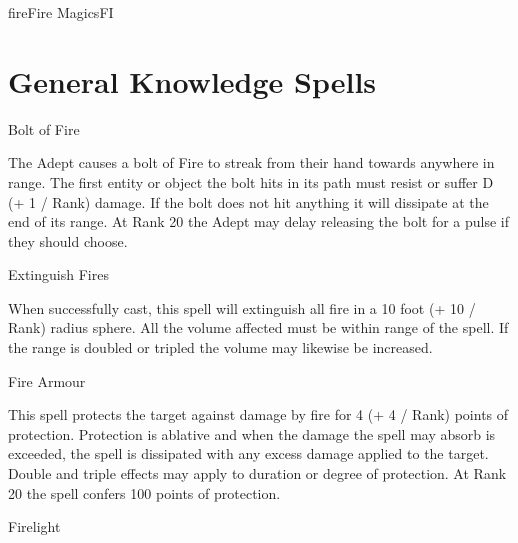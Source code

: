 \begin{College}[2.0]{fire}{Fire Magics}{FI}
\section{General Knowledge Spells}

\begin{spell}[G-1]{Bolt of Fire}

\begin{effects}
The Adept causes a bolt of Fire to streak from their hand towards
anywhere in range.  The first entity or object the bolt hits in its
path must resist or suffer D (+ 1 / Rank) damage.  If the bolt does
not hit anything it will dissipate at the end of its range. At Rank 20
the Adept may delay releasing the bolt for a pulse if they should
choose.

\end{effects}
\end{spell}

\begin{spell}[G-2]{Extinguish Fires}

\begin{effects}
When successfully cast, this spell will extinguish all fire in a 10
foot (+ 10 / Rank) radius sphere.  All the volume affected must be
within range of the spell. If the range is doubled or tripled the
volume may likewise be increased.
\end{effects}
\end{spell}

\begin{spell}[G-3]{Fire Armour}
\begin{effects}
This spell protects the target against damage by fire for 4 (+ 4 /
Rank) points of protection.  Protection is ablative and when the
damage the spell may absorb is exceeded, the spell is dissipated with
any excess damage applied to the target.  Double and triple effects
may apply to duration or degree of protection.  At Rank 20 the spell
confers 100 points of protection.
\end{effects}
\end{spell}

\begin{spell}[G-4]{Firelight}


\end{spell}
\end{College}
